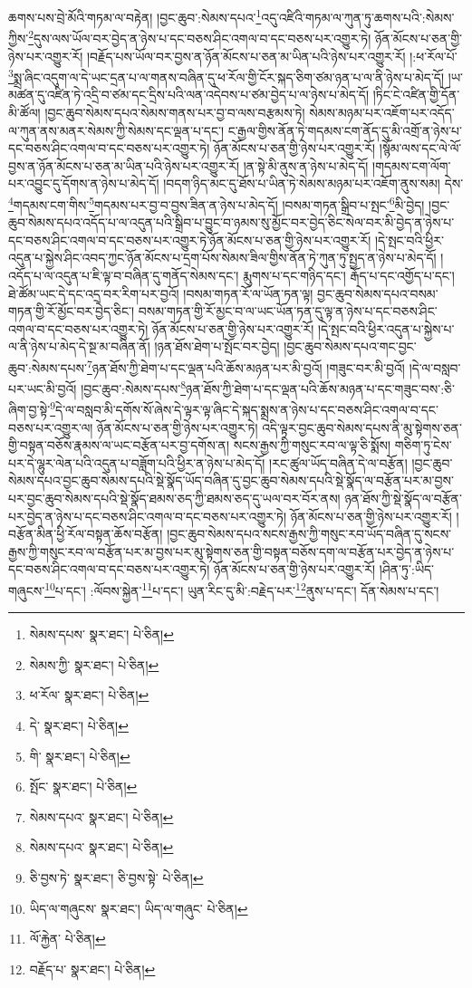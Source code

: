 ཆགས་པས་བྲེ་མོའི་གཏམ་ལ་བརྟེན། །བྱང་ཆུབ་:སེམས་དཔའ་\footnote{སེམས་དཔས་  སྣར་ཐང་།  པེ་ཅིན། }འདུ་འཛིའི་གཏམ་ལ་ཀུན་ཏུ་ཆགས་པའི་:སེམས་ཀྱིས་\footnote{སེམས་ཀྱི་  སྣར་ཐང་།  པེ་ཅིན། }དུས་ལས་ཡོལ་བར་བྱེད་ན་ཉེས་པ་དང་བཅས་ཤིང་འགལ་བ་དང་བཅས་པར་འགྱུར་ཏེ། ཉོན་མོངས་པ་ཅན་གྱི་ཉེས་པར་འགྱུར་རོ། །བརྗོད་པས་ཡོལ་བར་བྱས་ན་ཉོན་མོངས་པ་ཅན་མ་ཡིན་པའི་ཉེས་པར་འགྱུར་རོ། །:ཕ་རོལ་པོ་\footnote{ཕ་རོལ་  སྣར་ཐང་།  པེ་ཅིན། }སྨྲ་ཞིང་འདུག་ལ་དེ་ཡང་དྲན་པ་ལ་གནས་བཞིན་དུ་ཕ་རོལ་གྱི་ངོར་སྐད་ཅིག་ཙམ་ཉན་པ་ལ་ནི་ཉེས་པ་མེད་དོ། །ཡ་མཚན་དུ་འཛིན་ཏེ་འདྲི་བ་ཙམ་དང་དྲིས་པའི་ལན་འདེབས་པ་ཙམ་བྱེད་པ་ལ་ཉེས་པ་མེད་དོ། །ཏིང་ངེ་འཛིན་གྱི་དོན་མི་ཚོལ། །བྱང་ཆུབ་སེམས་དཔའ་སེམས་གནས་པར་བྱ་བ་ལས་བརྩམས་ཏེ། སེམས་མཉམ་པར་འཇོག་པར་འདོད་ལ་ཀུན་ནས་མནར་སེམས་ཀྱི་སེམས་དང་ལྡན་པ་དང་། ང་རྒྱལ་གྱིས་ནོན་ཏེ་གདམས་ངག་ནོད་དུ་མི་འགྲོ་ན་ཉེས་པ་དང་བཅས་ཤིང་འགལ་བ་དང་བཅས་པར་འགྱུར་ཏེ། ཉོན་མོངས་པ་ཅན་གྱི་ཉེས་པར་འགྱུར་རོ། །སྙོམ་ལས་དང་ལེ་ལོ་བྱས་ན་ཉོན་མོངས་པ་ཅན་མ་ཡིན་པའི་ཉེས་པར་འགྱུར་རོ། །ན་སྟེ་མི་ནུས་ན་ཉེས་པ་མེད་དོ། །གདམས་ངག་ལོག་པར་འབྱུང་དུ་དོགས་ན་ཉེས་པ་མེད་དོ། །བདག་ཉིད་མང་དུ་ཐོས་པ་ཡིན་ཏེ་སེམས་མཉམ་པར་འཇོག་ནུས་སམ། དེས་\footnote{དེ་  སྣར་ཐང་།  པེ་ཅིན། }གདམས་ངག་གིས་\footnote{གི་  སྣར་ཐང་།  པེ་ཅིན། }གདམས་པར་བྱ་བ་བྱས་ཟིན་ན་ཉེས་པ་མེད་དོ། །བསམ་གཏན་སྒྲིབ་པ་སྤང་\footnote{སྤོང་  སྣར་ཐང་།  པེ་ཅིན། }མི་བྱེད། །བྱང་ཆུབ་སེམས་དཔའ་འདོད་པ་ལ་འདུན་པའི་སྒྲིབ་པ་བྱུང་བ་ཉམས་སུ་མྱོང་བར་བྱེད་ཅིང་སེལ་བར་མི་བྱེད་ན་ཉེས་པ་དང་བཅས་ཤིང་འགལ་བ་དང་བཅས་པར་འགྱུར་ཏེ་ཉོན་མོངས་པ་ཅན་གྱི་ཉེས་པར་འགྱུར་རོ། །དེ་སྤང་བའི་ཕྱིར་འདུན་པ་སྐྱེས་ཤིང་འབད་ཀྱང་ཉོན་མོངས་པ་དྲག་པོས་སེམས་ཟིལ་གྱིས་ནོན་ཏེ་ཀུན་ཏུ་སྤྱད་ན་ཉེས་པ་མེད་དོ། །འདོད་པ་ལ་འདུན་པ་ཇི་ལྟ་བ་བཞིན་དུ་གནོད་སེམས་དང་། རྨུགས་པ་དང་གཉིད་དང་། རྒོད་པ་དང་འགྱོད་པ་དང་། ཐེ་ཚོམ་ཡང་དེ་དང་འདྲ་བར་རིག་པར་བྱའོ། །བསམ་གཏན་རོ་ལ་ཡོན་ཏན་ལྟ། བྱང་ཆུབ་སེམས་དཔའ་བསམ་གཏན་གྱི་རོ་མྱོང་བར་བྱེད་ཅིང་། བསམ་གཏན་གྱི་རོ་མྱང་བ་ལ་ཡང་ཡོན་ཏན་དུ་ལྟ་ན་ཉེས་པ་དང་བཅས་ཤིང་འགལ་བ་དང་བཅས་པར་འགྱུར་ཏེ། ཉོན་མོངས་པ་ཅན་གྱི་ཉེས་པར་འགྱུར་རོ། །དེ་སྤང་བའི་ཕྱིར་འདུན་པ་སྐྱེས་པ་ལ་ནི་ཉེས་པ་མེད་དེ་སྔ་མ་བཞིན་ནོ། །ཉན་ཐོས་ཐེག་པ་སྤོང་བར་བྱེད། །བྱང་ཆུབ་སེམས་དཔའ་གང་བྱང་ཆུབ་:སེམས་དཔས་\footnote{སེམས་དཔའ་  སྣར་ཐང་།  པེ་ཅིན། }ཉན་ཐོས་ཀྱི་ཐེག་པ་དང་ལྡན་པའི་ཆོས་མཉན་པར་མི་བྱའོ། །གཟུང་བར་མི་བྱའོ། །དེ་ལ་བསླབ་པར་ཡང་མི་བྱའོ། །བྱང་ཆུབ་:སེམས་དཔས་\footnote{སེམས་དཔའ་  སྣར་ཐང་།  པེ་ཅིན། }ཉན་ཐོས་ཀྱི་ཐེག་པ་དང་ལྡན་པའི་ཆོས་མཉན་པ་དང་གཟུང་བས་:ཅི་ཞིག་བྱ་སྟེ་\footnote{ཅི་བྱས་ཏེ་  སྣར་ཐང་། ཅི་བྱས་སྟེ་  པེ་ཅིན། }དེ་ལ་བསླབ་མི་དགོས་སོ་ཞེས་དེ་ལྟར་ལྟ་ཞིང་དེ་སྐད་སྨྲས་ན་ཉེས་པ་དང་བཅས་ཤིང་འགལ་བ་དང་བཅས་པར་འགྱུར་ལ། ཉོན་མོངས་པ་ཅན་གྱི་ཉེས་པར་འགྱུར་ཏེ། འདི་ལྟར་བྱང་ཆུབ་སེམས་དཔས་ནི་མུ་སྟེགས་ཅན་གྱི་བསྟན་བཅོས་རྣམས་ལ་ཡང་བརྩོན་པར་བྱ་དགོས་ན། སངས་རྒྱས་ཀྱི་གསུང་རབ་ལ་ལྟ་ཅི་སྨོས། གཅིག་ཏུ་ངེས་པར་དེ་ལྷུར་ལེན་པའི་འདུན་པ་བཟློག་པའི་ཕྱིར་ན་ཉེས་པ་མེད་དོ། །རང་ཚུལ་ཡོད་བཞིན་དེ་ལ་བརྩོན། །བྱང་ཆུབ་སེམས་དཔའ་བྱང་ཆུབ་སེམས་དཔའི་སྡེ་སྣོད་ཡོད་བཞིན་དུ་བྱང་ཆུབ་སེམས་དཔའི་སྡེ་སྣོད་ལ་བརྩོན་པར་མ་བྱས་པར་བྱང་ཆུབ་སེམས་དཔའི་སྡེ་སྣོད་ཐམས་ཅད་ཀྱི་ཐམས་ཅད་དུ་ཡལ་བར་བོར་ནས། ཉན་ཐོས་ཀྱི་སྡེ་སྣོད་ལ་བརྩོན་པར་བྱེད་ན་ཉེས་པ་དང་བཅས་ཤིང་འགལ་བ་དང་བཅས་པར་འགྱུར་ཏེ། ཉོན་མོངས་པ་ཅན་གྱི་ཉེས་པར་འགྱུར་རོ། །བརྩོན་མིན་ཕྱི་རོལ་བསྟན་ཆོས་བརྩོན། །བྱང་ཆུབ་སེམས་དཔའ་སངས་རྒྱས་ཀྱི་གསུང་རབ་ཡོད་བཞིན་དུ་སངས་རྒྱས་ཀྱི་གསུང་རབ་ལ་བརྩོན་པར་མ་བྱས་པར་མུ་སྟེགས་ཅན་གྱི་བསྟན་བཅོས་དག་ལ་བརྩོན་པར་བྱེད་ན་ཉེས་པ་དང་བཅས་ཤིང་འགལ་བ་དང་བཅས་པར་འགྱུར་ཏེ། ཉོན་མོངས་པ་ཅན་གྱི་ཉེས་པར་འགྱུར་རོ། །ཤིན་ཏུ་:ཡིད་གཞུངས་\footnote{ཡིད་ལ་གཞུངས་  སྣར་ཐང་། ཡིད་ལ་གཞུང་  པེ་ཅིན། }པ་དང་། :ལོབས་སྐྱེན་\footnote{ལོ་རྐྱེན་  པེ་ཅིན། }པ་དང་། ཡུན་རིང་དུ་མི་:བརྗེད་པར་\footnote{བརྗོད་པ་  སྣར་ཐང་།  པེ་ཅིན། }ནུས་པ་དང་། དོན་སེམས་པ་དང་། 